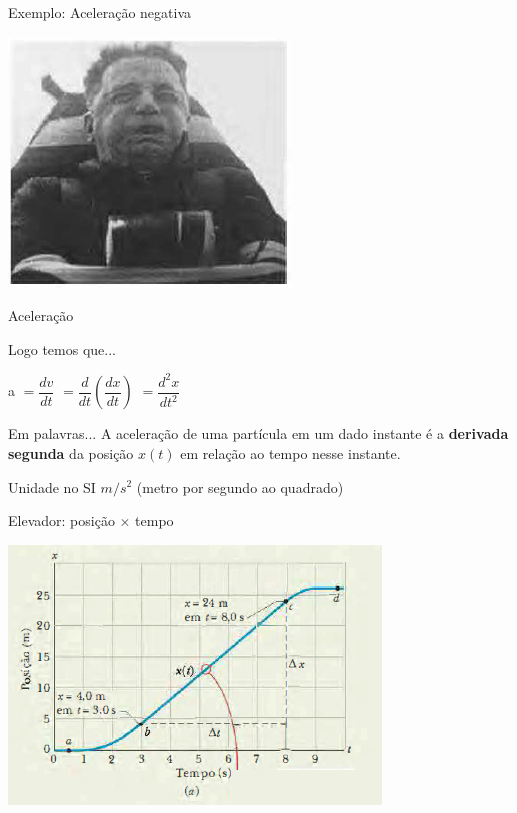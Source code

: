 \documentclass[xcolor=dvipsnames,table]{beamer}
\begin{document}
	\begin{frame}{Exemplo: Aceleração negativa}
		\begin{center}
			\includegraphics[scale=0.8]{images/fig2-7c}
		\end{center}
	\end{frame}

	\begin{frame}{Aceleração}
		\begin{block}{Logo temos que...}
			\begin{center}
				a $= \dfrac{d v}{d t}$ 
				$ = \dfrac{d}{d t} \left( \dfrac{d x}{d t} \right)$ 
				$ = \dfrac{d^2x}{d t^2} $
			\end{center} 
		\end{block}
		\begin{block}{Em palavras...}
			A aceleração de uma partícula em um dado instante é a {\bf derivada segunda} da posição $x(t)$ em relação ao tempo nesse instante.
		\end{block} 
		\begin{block}{Unidade no SI}
			$m/s^2$ (metro por segundo ao quadrado)
		\end{block}
	\end{frame}

	\begin{frame}{Elevador: posição $\times$ tempo}
		\begin{center}
			\includegraphics[scale=0.7]{images/fig2-6a}
		\end{center}
	\end{frame}
	
\end{document}
